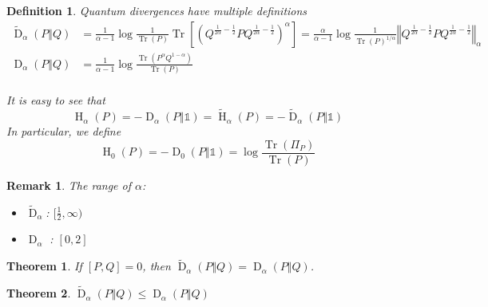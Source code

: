\documentclass[aps,pra,onecolumn,notitlepage,superscriptaddress]{revtex4-1}
\newcommand{\Tr}{\operatorname{Tr}}
\newcommand{\op}[1]{\operatorname{#1}}
\newcommand\I{\mathds{1}}
\newtheorem{theo}{Theorem}
\newtheorem{defi}{Definition}
\newtheorem{rem}{Remark}
\begin{document}
    \begin{defi}
        Quantum divergences have multiple definitions
        \begin{align*}
            \widetilde{\op D}_\alpha(P \Vert Q) &= \frac{1}{\alpha-1} \log \frac{1}{\Tr(P)} \Tr[ ( Q^{\frac{1}{2\alpha} - \frac 1 2} P Q^{\frac{1}{2\alpha} - \frac 1 2} )^\alpha ] 
            = \frac{\alpha}{\alpha - 1} \log \frac{1}{\Tr(P)^{1/\alpha}} 
            \left\Vert Q^{\frac{1}{2\alpha} - \frac 1 2} P Q^{\frac{1}{2\alpha} - \frac 1 2} \right\Vert_\alpha
            \\
            \op D_\alpha (P \Vert Q) &= \frac{1}{\alpha - 1} \log \frac{\Tr(P^\alpha Q^{1-\alpha})}{\Tr(P)} \\
        \end{align*}

        It is easy to see that
        \begin{equation}
            \op H_\alpha(P)= -\op D_\alpha(P \Vert \I) = \widetilde{\op H}_\alpha(P) = - \widetilde{\op D}_\alpha(P \Vert \I)
        \end{equation}
        In particular, we define
        \begin{equation}
            \op H_0(P) = - \op D_0(P \Vert \I) = \log \frac{\Tr(\Pi_P)}{\Tr(P)}
        \end{equation}
    \end{defi}

    \begin{rem}
        The range of $\alpha$:
        \begin{itemize}
            \item $\widetilde{\op D}_\alpha$: $[\frac 1 2, \infty)$
            \item $\op D_\alpha$ : $[0, 2]$
        \end{itemize}
    \end{rem}

    \begin{theo}
        If $[P,Q] = 0$, then $\widetilde{\op D}_\alpha(P \Vert Q) = \op D_\alpha(P \Vert Q)$.
    \end{theo}
    \begin{theo}
        $\widetilde{\op D}_\alpha(P \Vert Q) \leq \op D_\alpha(P \Vert Q)$
    \end{theo}
\end{document}
